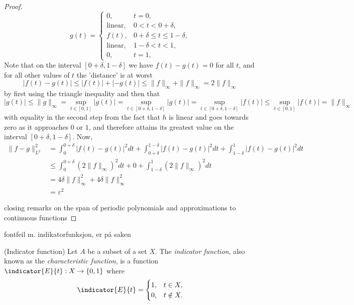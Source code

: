 \documentclass[../thesis.tex]{subfiles}
\begin{document}
\begin{proof}
\begin{equation*}
    g(t) = 
    \begin{cases} 0, &  t=0,\\  
        \text{linear}, &  0<t<0+\delta,\\ 
        f(t), & 0+\delta \leq t \leq 1-\delta,\\ 
        \text{linear}, &  1-\delta <t<1,\\ 
        0, &  t=1,
    \end{cases}
\end{equation*}
Note that on the interval $[0+\delta, 1-\delta]$ we have $f(t)-g(t)= 0$ for all $t$, and for all other values of $t$ the 'distance' is at worst 
\begin{equation*}
    \left|f(t)-g(t) \right| \leq |f(t)| + |-g(t)| \leq \|f \|_{\infty} + \|f \|_{\infty} = 2 \|f \|_{\infty}
\end{equation*}
by first using the triangle inequality and then that
\begin{equation*}
    |g(t)| \leq \|g\|_{\infty} = \sup_{t\in[0,1]} |g(t)| = \sup_{t\in[0+\delta, 1-\delta]} |g(t)| = \sup_{t\in[0+\delta, 1-\delta]} |f(t)| \leq \sup_{t\in[0, 1]} |f(t)| =\| f\|_{\infty}
\end{equation*}
with equality in the second step from the fact that $h$ is linear and goes towards zero as it approaches $0$ or $1$, and therefore attains its greatest value on the interval $[0+\delta,1-\delta]$. Now,
\begin{align*}
    \| f-g \|_{L^2}^2 &=  \int_0^{0+\delta} \left|f(t)-g(t) \right|^2dt + \int_{0+\delta}^{1-\delta} \left|f(t)-g(t) \right|^2dt +\int_{1-\delta}^{1} \left|f(t)-g(t) \right|^2dt\\ 
    &\leq \int_0^{0+\delta} (2 \| f\|_\infty)^2dt + 0 +\int_{1-\delta}^{1} (2 \| f\|_\infty)^2dt\\
    &=  4 \delta \| f\|_\infty^2 + 4 \delta \| f\|_\infty^2\\ 
    &= \varepsilon^2
\end{align*}

closing remarks on the span of periodic polynomials and approximations to continuous functions
\end{proof}

\colorbox{BurntOrange}{fontfeil m. indikatorfunksjon, er på saken}
\begin{definition}(Indicator function)\label{def:indicator}
    Let $A$ be a subset of a set $X$. The \emph{indicator function}, also known as the \emph{characteristic function}, is a function $\indicator{E}{t}: X \rightarrow \braq{0,1}$ where
    \begin{equation*}
        \indicator{E}{t}  = 
        \begin{cases} 
            1, &  t\in X,\\
            0, &  t \notin X.
        \end{cases}
    \end{equation*}
\end{definition}
\end{document}
